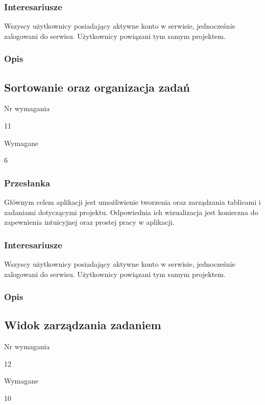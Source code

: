 \documentclass[eng,printmode]{mgr}
\begin{document}
\subsubsection{Interesariusze}
Wszyscy użytkownicy posiadający aktywne konto w serwisie, jednocześnie zalogowani do serwisu. Użytkownicy powiązani tym samym projektem.

\subsubsection{Opis}
\newpage

\subsection{Sortowanie oraz organizacja zadań}
\begin{labeling}{Nr wymagania}
\item [Nr wymagania:] 11
\item [Priorytet:] Wymagane
\item [Powiązania:] 6
\end{labeling}

\subsubsection{Przesłanka}
Głównym celem aplikacji jest umożliwienie tworzenia oraz zarządzania tablicami i zadaniami dotyczącymi projektu. Odpowiednia ich wizualizacja jest konieczna do zapewnienia intuicyjnej oraz prostej pracy w aplikacji.

\subsubsection{Interesariusze}
Wszyscy użytkownicy posiadający aktywne konto w serwisie, jednocześnie zalogowani do serwisu. Użytkownicy powiązani tym samym projektem.

\subsubsection{Opis}
\newpage

\subsection{Widok zarządzania zadaniem}
\begin{labeling}{Nr wymagania}
\item [Nr wymagania:] 12
\item [Priorytet:] Wymagane
\item [Powiązania:] 10
\end{labeling}
\end{document}

